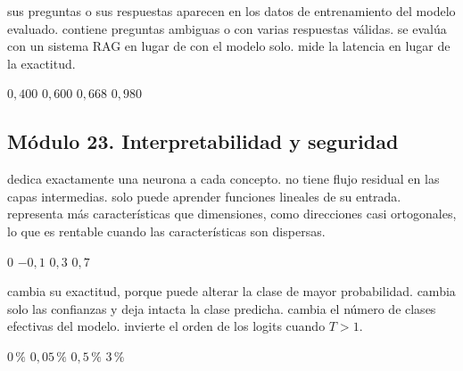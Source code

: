 {sus preguntas o sus respuestas aparecen en los datos de entrenamiento del modelo evaluado.}
{contiene preguntas ambiguas o con varias respuestas válidas.}
{se evalúa con un sistema RAG en lugar de con el modelo solo.}
{mide la latencia en lugar de la exactitud.}

{$0{,}400$}
{$0{,}600$}
{$0{,}668$}
{$0{,}980$}

\subsection*{Módulo 23. Interpretabilidad y seguridad}

{dedica exactamente una neurona a cada concepto.}
{no tiene flujo residual en las capas intermedias.}
{solo puede aprender funciones lineales de su entrada.}
{representa más características que dimensiones, como direcciones casi ortogonales, lo que es rentable cuando las características son dispersas.}

{$0$}
{$-0{,}1$}
{$0{,}3$}
{$0{,}7$}

{cambia su exactitud, porque puede alterar la clase de mayor probabilidad.}
{cambia solo las confianzas y deja intacta la clase predicha.}
{cambia el número de clases efectivas del modelo.}
{invierte el orden de los logits cuando $T>1$.}

{$0\,\%$}
{$0{,}05\,\%$}
{$0{,}5\,\%$}
{$3\,\%$}
